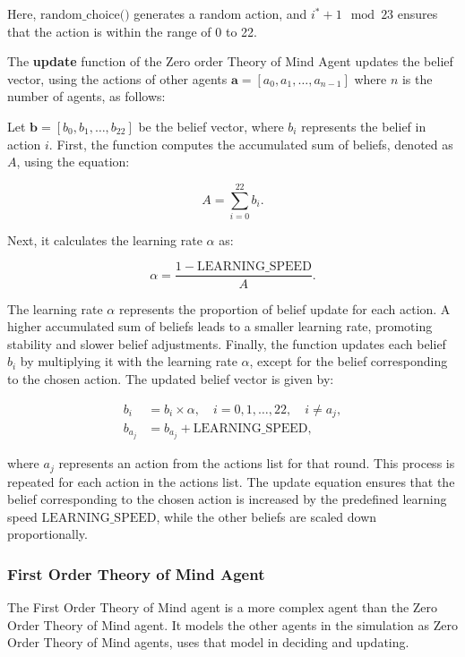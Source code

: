Here, $\text{{random\_choice()}}$ generates a random action, and $i^* + 1 \mod 23$ ensures that the action is within the range of 0 to 22.

The \textbf{update} function of the Zero order Theory of Mind Agent updates the belief vector, using the actions of other agents $\mathbf{a} = [a_0, a_1, \ldots, a_{n-1}]$ where $n$ is the number of agents, as follows: 

\label{eq:zero-order-update}
Let $\mathbf{b} = [b_0, b_1, \ldots, b_{22}]$ be the belief vector, where $b_i$ represents the belief in action $i$. First, the function computes the accumulated sum of beliefs, denoted as $A$, using the equation:

\[
A = \sum_{i=0}^{22} b_i.
\]

Next, it calculates the learning rate $\alpha$ as:

\[
\alpha = \frac{{1 - \text{{LEARNING\_SPEED}}}}{{A}}.
\]

The learning rate $\alpha$ represents the proportion of belief update for each action. A higher accumulated sum of beliefs leads to a smaller learning rate, promoting stability and slower belief adjustments. Finally, the function updates each belief $b_i$ by multiplying it with the learning rate $\alpha$, except for the belief corresponding to the chosen action. The updated belief vector is given by:

\[
\begin{aligned}
b_i & = b_i \times \alpha, \quad i = 0, 1, \ldots, 22, \quad i \neq a_j, \\
b_{a_{j}} & = b_{a_{j}} + \text{{LEARNING\_SPEED}},
\end{aligned}
\]

where $a_j$ represents an action from the actions list for that round. This process is repeated for each action in the actions list. The update equation ensures that the belief corresponding to the chosen action is increased by the predefined learning speed $\text{{LEARNING\_SPEED}}$, while the other beliefs are scaled down proportionally.

\subsubsection{First Order Theory of Mind Agent}

The First Order Theory of Mind agent is a more complex agent than the Zero Order Theory of Mind agent. It models the other agents in the simulation as Zero Order Theory of Mind agents, uses that model in deciding and updating. 

